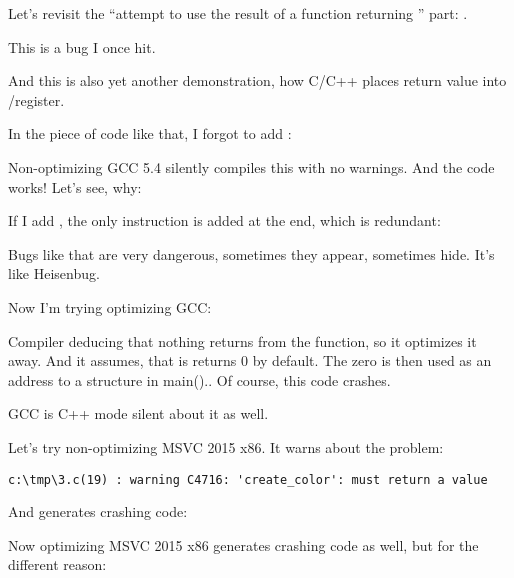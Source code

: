 \label{ForgottenReturn}

Let's revisit the ``attempt to use the result of a function returning \Tvoid'' part: \label{UseResultOfVoidFunc}.

This is a bug I once hit.

And this is also yet another demonstration, how C/C++ places return value into \EAX/\RAX register.

In the piece of code like that, I forgot to add :



Non-optimizing GCC 5.4 silently compiles this with no warnings.
And the code works!
Let's see, why:



If I add , the only instruction is added at the end, which is redundant:



Bugs like that are very dangerous, sometimes they appear, sometimes hide.
It's like Heisenbug.

Now I'm trying optimizing GCC:



Compiler deducing that nothing returns from the function, so it optimizes it away.
And it assumes, that is returns 0 by default. The zero is then used as an address to a structure in main()..
Of course, this code crashes.

GCC is C++ mode silent about it as well.

Let's try non-optimizing MSVC 2015 x86.
It warns about the problem:

\begin{lstlisting}
c:\tmp\3.c(19) : warning C4716: 'create_color': must return a value                                                               
\end{lstlisting}

And generates crashing code:



Now optimizing MSVC 2015 x86 generates crashing code as well, but for the different reason:

